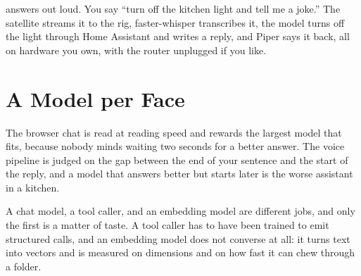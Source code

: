 
 answers out loud. You say ``turn off the kitchen light
and tell me a joke.''
The satellite streams it to the rig, faster-whisper transcribes it, the model turns
off the light through Home Assistant and writes a reply, and Piper says it back, all
on hardware you own, with the router unplugged if you like.


\section{A Model per Face}

 The browser chat is read at
reading speed and rewards the largest model that fits, because nobody minds
waiting two seconds for a better answer. The voice pipeline is judged on the gap
between the end of your sentence and the start of the reply, and a model that
answers better but starts later is the worse assistant in a kitchen.


 A chat model, a tool caller, and an
embedding model are different jobs, and only the first is a matter of taste. A
tool caller has to have been trained to emit structured calls, and an embedding
model does not converse at all: it turns text into vectors and is measured on
dimensions and on how fast it can chew through a folder.

